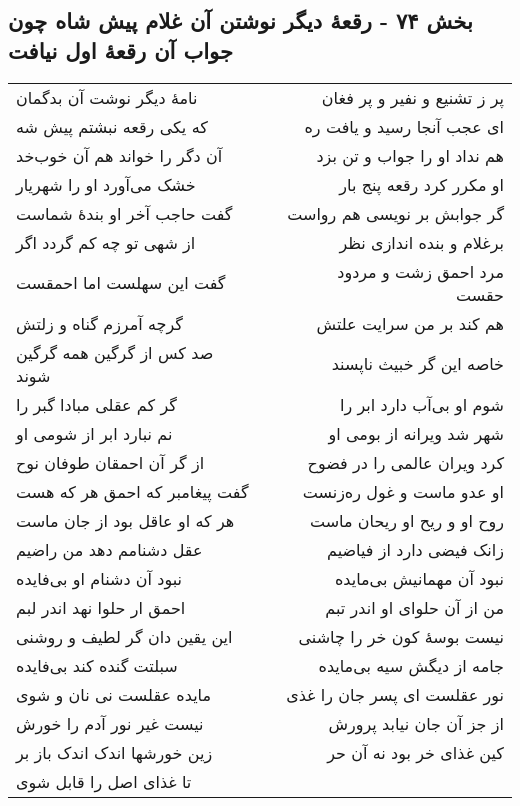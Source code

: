 \begin{center}
\section*{بخش ۷۴ - رقعهٔ دیگر نوشتن آن غلام پیش شاه چون جواب آن رقعهٔ اول نیافت}
\label{sec:sh074}
\begin{longtable}{l p{0.5cm} r}
نامهٔ دیگر نوشت آن بدگمان
&&
پر ز تشنیع و نفیر و پر فغان
\\
که یکی رقعه نبشتم پیش شه
&&
ای عجب آنجا رسید و یافت ره
\\
آن دگر را خواند هم آن خوب‌خد
&&
هم نداد او را جواب و تن بزد
\\
خشک می‌آورد او را شهریار
&&
او مکرر کرد رقعه پنج بار
\\
گفت حاجب آخر او بندهٔ شماست
&&
گر جوابش بر نویسی هم رواست
\\
از شهی تو چه کم گردد اگر
&&
برغلام و بنده اندازی نظر
\\
گفت این سهلست اما احمقست
&&
مرد احمق زشت و مردود حقست
\\
گرچه آمرزم گناه و زلتش
&&
هم کند بر من سرایت علتش
\\
صد کس از گرگین همه گرگین شوند
&&
خاصه این گر خبیث ناپسند
\\
گر کم عقلی مبادا گبر را
&&
شوم او بی‌آب دارد ابر را
\\
نم نبارد ابر از شومی او
&&
شهر شد ویرانه از بومی او
\\
از گر آن احمقان طوفان نوح
&&
کرد ویران عالمی را در فضوح
\\
گفت پیغامبر که احمق هر که هست
&&
او عدو ماست و غول ره‌زنست
\\
هر که او عاقل بود از جان ماست
&&
روح او و ریح او ریحان ماست
\\
عقل دشنامم دهد من راضیم
&&
زانک فیضی دارد از فیاضیم
\\
نبود آن دشنام او بی‌فایده
&&
نبود آن مهمانیش بی‌مایده
\\
احمق ار حلوا نهد اندر لبم
&&
من از آن حلوای او اندر تبم
\\
این یقین دان گر لطیف و روشنی
&&
نیست بوسهٔ کون خر را چاشنی
\\
سبلتت گنده کند بی‌فایده
&&
جامه از دیگش سیه بی‌مایده
\\
مایده عقلست نی نان و شوی
&&
نور عقلست ای پسر جان را غذی
\\
نیست غیر نور آدم را خورش
&&
از جز آن جان نیابد پرورش
\\
زین خورشها اندک اندک باز بر
&&
کین غذای خر بود نه آن حر
\\
تا غذای اصل را قابل شوی

\end{longtable}
\end{center}

